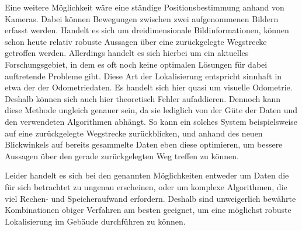 Eine weitere Möglichkeit wäre eine ständige Positionsbestimmung anhand von Kameras. Dabei können Bewegungen zwischen zwei aufgenommenen Bildern erfasst werden. Handelt es sich um dreidimensionale Bildinformationen, können schon heute relativ robuste Aussagen über eine zurückgelegte Wegstrecke getroffen werden. Allerdings handelt es sich hierbei um ein aktuelles Forschungsgebiet, in dem es oft noch keine optimalen Lösungen für dabei auftretende Probleme gibt. Diese Art der Lokalisierung entspricht sinnhaft in etwa der der Odometriedaten. Es handelt sich hier quasi um visuelle Odometrie. Deshalb können sich auch hier theoretisch Fehler aufaddieren. Dennoch kann diese Methode ungleich genauer sein, da sie lediglich von der Güte der Daten und den verwendeten Algorithmen abhängt. So kann ein solches System beispielsweise auf eine zurückgelegte Wegstrecke zurückblicken, und anhand des neuen Blickwinkels auf bereits gesammelte Daten eben diese optimieren, um bessere Aussagen über den gerade zurückgelegten Weg treffen zu können.

Leider handelt es sich bei den genannten Möglichkeiten entweder um Daten die für sich betrachtet zu ungenau erscheinen, oder um komplexe Algorithmen, die viel Rechen- und Speicheraufwand erfordern. Deshalb sind unweigerlich bewährte Kombinationen obiger Verfahren am besten geeignet, um eine möglichst robuste Lokalisierung im Gebäude durchführen zu können.